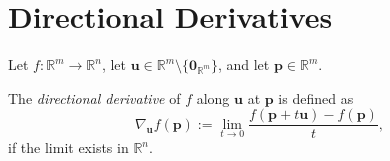 \section{Directional Derivatives}


\begin{definition}
	\label{def: directional derivatives}
	Let $f: \mathbb R^m \to \mathbb R^n$, let $\mathbf u \in \mathbb R^m \setminus \{\mathbf 0_{\mathbb R^m}\}$, and let $\mathbf p \in \mathbb R^m$.
	
	The \textit{directional derivative} of $f$ along $\mathbf u$ at $\mathbf p$ is defined as
	$$
	\nabla_{\mathbf u} f(\mathbf p) := \lim_{t \to 0} \frac{f(\mathbf p + t\mathbf u) - f(\mathbf p)}{t},
	$$
	if the limit exists in $\mathbb R^n$.
\end{definition}


